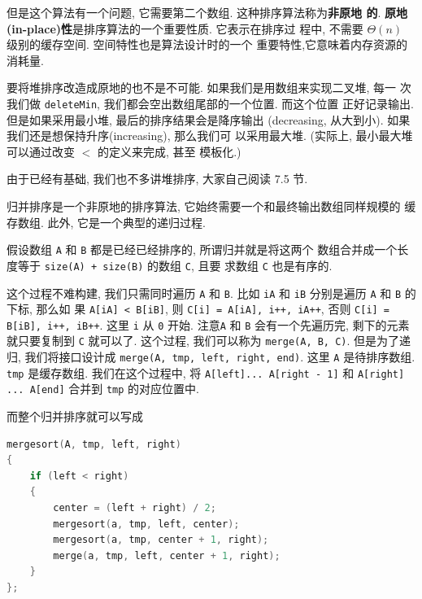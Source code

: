 \documentclass[a4paper]{ctexart}
\theoremstyle{definition}
\theoremstyle{definition}
\begin{document}
但是这个算法有一个问题, 它需要第二个数组. 这种排序算法称为{\bf 非原地
  的}. {\bf 原地(in-place)性}是排序算法的一个重要性质. 它表示在排序过
程中, 不需要 $\Theta(n)$ 级别的缓存空间. 空间特性也是算法设计时的一个
重要特性,它意味着内存资源的消耗量.

要将堆排序改造成原地的也不是不可能. 如果我们是用数组来实现二叉堆, 每一
次我们做 \verb|deleteMin|, 我们都会空出数组尾部的一个位置. 而这个位置
正好记录输出. 但是如果采用最小堆, 最后的排序结果会是降序输出
(decreasing, 从大到小). 如果我们还是想保持升序(increasing), 那么我们可
以采用最大堆.  (实际上, 最小最大堆可以通过改变 $<$ 的定义来完成, 甚至
模板化.)

由于已经有基础, 我们也不多讲堆排序, 大家自己阅读 7.5 节.


归并排序是一个非原地的排序算法, 它始终需要一个和最终输出数组同样规模的
缓存数组. 此外, 它是一个典型的递归过程.

假设数组 \verb|A| 和 \verb|B| 都是已经已经排序的, 所谓归并就是将这两个
数组合并成一个长度等于 \verb|size(A) + size(B)| 的数组 \verb|C|, 且要
求数组 \verb|C| 也是有序的.

这个过程不难构建, 我们只需同时遍历 \verb|A| 和 \verb|B|. 比如
\verb|iA| 和 \verb|iB| 分别是遍历 \verb|A| 和 \verb|B| 的下标, 那么如
果 \verb|A[iA] < B[iB]|, 则\newline
\verb|C[i] = A[iA], i++, iA++|, \newline
否则 \newline
\verb|C[i] = B[iB], i++, iB++|. \newline
这里 \verb|i| 从 \verb|0| 开始. 注意\verb|A| 和 \verb|B| 会有一个先遍历完,
剩下的元素就只要复制到 \verb|C| 就可以了. 这个过程, 我们可以称为\newline
\verb|merge(A, B, C)|. \newline
但是为了递归, 我们将接口设计成\newline
\verb|merge(A, tmp, left, right, end)|. \newline
这里 \verb|A| 是待排序数组. \verb|tmp| 是缓存数组. 我们在这个过程中, 将\newline
\verb|A[left]... A[right - 1]| \newline
和
\newline \verb|A[right] ... A[end]| \newline
合并到 \verb|tmp| 的对应位置中.

而整个归并排序就可以写成

\begin{lstlisting}[language=C++]
mergesort(A, tmp, left, right)
{
	if (left < right)
	{
		center = (left + right) / 2;
		mergesort(a, tmp, left, center);
		mergesort(a, tmp, center + 1, right);
		merge(a, tmp, left, center + 1, right);
	}
};
\end{lstlisting}
\end{document}
